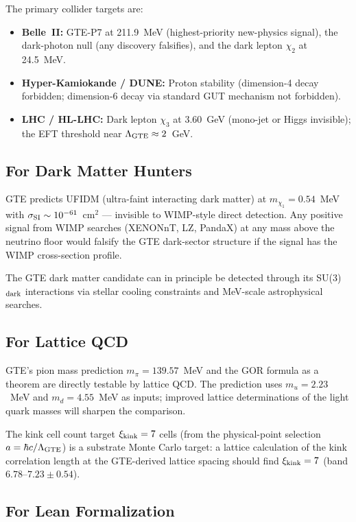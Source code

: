 \documentclass[11pt,a4paper]{article}
\begin{document}
The primary collider targets are:
\begin{itemize}[itemsep=3pt]
  \item \textbf{Belle~II:} GTE-P7 at 211.9~MeV (highest-priority new-physics
    signal), the dark-photon null (any discovery falsifies), and the dark lepton
    $\chi_2$ at 24.5~MeV.
  \item \textbf{Hyper-Kamiokande / DUNE:} Proton stability (dimension-4 decay
    forbidden; dimension-6 decay via standard GUT mechanism not forbidden).
  \item \textbf{LHC / HL-LHC:} Dark lepton $\chi_3$ at 3.60~GeV (mono-jet or
    Higgs invisible); the EFT threshold near $\Lambda_{\rm GTE} \approx 2$~GeV.
\end{itemize}

\subsection{For Dark Matter Hunters}

GTE predicts UFIDM (ultra-faint interacting dark matter) at $m_{\chi_1} = 0.54$~MeV
with $\sigma_{\rm SI} \sim 10^{-61}$~cm$^2$ — invisible to WIMP-style direct
detection.  Any positive signal from WIMP searches (XENONnT, LZ, PandaX) at
any mass above the neutrino floor would falsify the GTE dark-sector structure
if the signal has the WIMP cross-section profile.

The GTE dark matter candidate can in principle be detected through its
SU(3)$_{\rm dark}$ interactions via stellar cooling constraints and MeV-scale
astrophysical searches.

\subsection{For Lattice QCD}

GTE's pion mass prediction $m_\pi = 139.57$~MeV and the GOR formula as a
theorem are directly testable by lattice QCD.  The prediction uses $m_u = 2.23$~MeV
and $m_d = 4.55$~MeV as inputs; improved lattice determinations of the light quark
masses will sharpen the comparison.

The kink cell count target $\xi_{\rm kink} = 7$ cells (from the physical-point
selection $a = \hbar c/\Lambda_{\rm GTE}$) is a substrate Monte Carlo target:
a lattice calculation of the kink correlation length at the GTE-derived lattice
spacing should find $\xi_{\rm kink} = 7$ (band $6.78$--$7.23 \pm 0.54$).

\subsection{For Lean Formalization}
\end{document}
